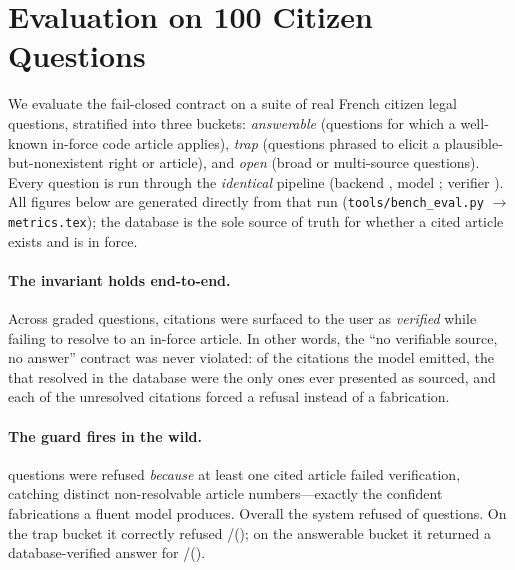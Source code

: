 \section{Evaluation on 100 Citizen Questions}
\label{sec:eval}

\evalModeBanner

We evaluate the fail-closed contract on a suite of \evalN real French
citizen legal questions, stratified into three buckets: \emph{answerable}
(\evalAnswerableN questions for which a well-known in-force code article
applies), \emph{trap} (\evalTrapN questions phrased to elicit a
plausible-but-nonexistent right or article), and \emph{open} (\evalOpenN broad
or multi-source questions). Every question is run through the \emph{identical}
pipeline (backend \evalBackend, model \evalModel; verifier \evalVerifier). All
figures below are generated directly from that run
(\texttt{tools/bench\_eval.py} $\to$ \texttt{metrics.tex}); the
database is the sole source of truth for whether a cited article exists and is
in force.

\paragraph{The invariant holds end-to-end.}
Across \evalGraded graded questions, \evalLeak citations were surfaced to the
user as \emph{verified} while failing to resolve to an in-force article. In
other words, the ``no verifiable source, no answer'' contract was never
violated: of the \evalCitTotal citations the model emitted, the \evalCitVerified
that resolved in the database were the only ones ever presented as sourced, and
each of the \evalCitFailed unresolved citations forced a refusal instead of a
fabrication.

\paragraph{The guard fires in the wild.}
\evalGuardFired questions were refused \emph{because} at least one cited article
failed verification, catching \evalDistinctInvented distinct non-resolvable
article numbers---exactly the confident fabrications a fluent model produces.
Overall the system refused \evalRefusalRate of questions. On the trap bucket it
correctly refused \evalTrapRefused/\evalTrapN (\evalTrapRate); on the answerable
bucket it returned a database-verified answer for
\evalAnswerableAnswered/\evalAnswerableN (\evalAnswerableRate).

